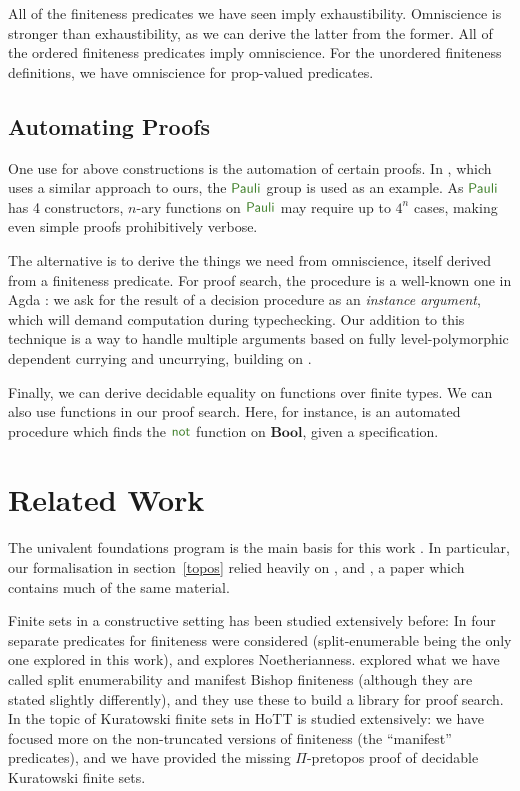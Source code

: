 All of the finiteness predicates we have seen imply exhaustibility.
Omniscience is stronger than exhaustibility, as we can derive the latter from
the former.
All of the ordered finiteness predicates imply omniscience.
For the unordered finiteness definitions, we have omniscience for prop-valued
predicates.
\subsection{Automating Proofs}
One use for above constructions is the automation of certain proofs.
In \cite{firsovDependentlyTypedProgramming2015}, which uses a similar approach
to ours, the \(\AgdaDatatype{Pauli}\) group is used as an example.
As \(\AgdaDatatype{Pauli}\) has 4 constructors, \(n\)-ary functions on
\(\AgdaDatatype{Pauli}\) may require up to \(4^n\) cases, making even simple
proofs prohibitively verbose.

The alternative is to derive the things we need from omniscience, itself derived
from a finiteness predicate.
For proof search, the procedure is a well-known one in Agda
\cite{devrieseBrightSideType2011}: we ask for the result of a decision procedure
as an \emph{instance argument}, which will demand computation during
typechecking.
Our addition to this technique is a way to handle multiple arguments based on
fully level-polymorphic dependent currying and uncurrying, building on 
\cite{allaisGenericLevelPolymorphic2019}.

Finally, we can derive decidable equality on functions over finite types.
We can also use functions in our proof search.
Here, for instance, is an automated procedure which finds the
\(\AgdaFunction{not}\) function on \(\mathbf{Bool}\), given a specification.
\section{Related Work}
The univalent foundations program is the main basis for this work
\cite{hottbook}.
In particular, our formalisation in section~\ref{topos} relied heavily on
\cite[chapter 10]{hottbook}, and \cite{rijkeSetsHomotopyType2015}, a paper which
contains much of the same material.

Finite sets in a constructive setting has been studied extensively before:
In \cite{coquandConstructivelyFinite2010} four separate predicates for
finiteness were considered (split-enumerable being the only one explored in this
work), and \cite{firsovVariationsNoetherianness2016} explores Noetherianness.
\cite{firsovDependentlyTypedProgramming2015} explored what we have called split
enumerability and manifest Bishop finiteness (although they are stated slightly
differently), and they use these to build a library for proof search.
In \cite{fruminFiniteSetsHomotopy2018} the topic of Kuratowski finite sets in
HoTT is studied extensively: we have focused more on the non-truncated versions
of finiteness (the ``manifest'' predicates), and we have provided the missing
\(\Pi\)-pretopos proof of decidable Kuratowski finite sets.

